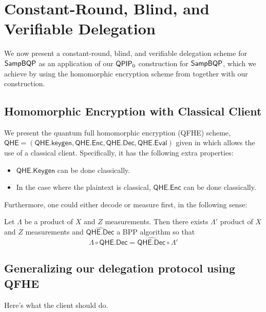 \section{Constant-Round, Blind, and Verifiable Delegation}


We now present a constant-round, blind, and verifiable delegation scheme for $\operatorname{\mathsf{SampBQP}}$ as an application of our $\operatorname{\mathsf{QPIP}}_0$ construction for $\operatorname{\mathsf{SampBQP}}$,
which we achieve by using the homomorphic encryption scheme from \cite{mahadev_qfhe} together with our construction.

\subsection{Homomorphic Encryption with Classical Client}


We present the quantum full homomorphic encryption (QFHE) scheme, $\mathsf{QHE}=(\mathsf{QHE.keygen}, \mathsf{QHE.Enc}, \mathsf{QHE.Dec}, \mathsf{QHE.Eval})$ given in \cite{mahadev_qfhe} which allows the use of a classical client. Specifically, it has the following extra properties:
\begin{itemize}
	\item $\mathsf{QHE.Keygen}$ can be done classically.
	\item In the case where the plaintext is classical, $\mathsf{QHE.Enc}$ can be done classically.
\end{itemize}

Furthermore, one could either decode or measure first, in the following sense:
\begin{lemma}
	\label{decodeMeasureOrder}
	Let $\Lambda$ be a product of $X$ and $Z$ measurements. Then there exists $\Lambda'$ product of $X$ and $Z$ measurements and $\widehat{\mathsf{QHE.Dec}}$ a BPP algorithm so that
		$$\Lambda\circ\mathsf{QHE.Dec}=\widehat{\mathsf{QHE.Dec}}\circ\Lambda'$$
\end{lemma}

\subsection{Generalizing our delegation protocol using QFHE}


Here's what the client should do.

